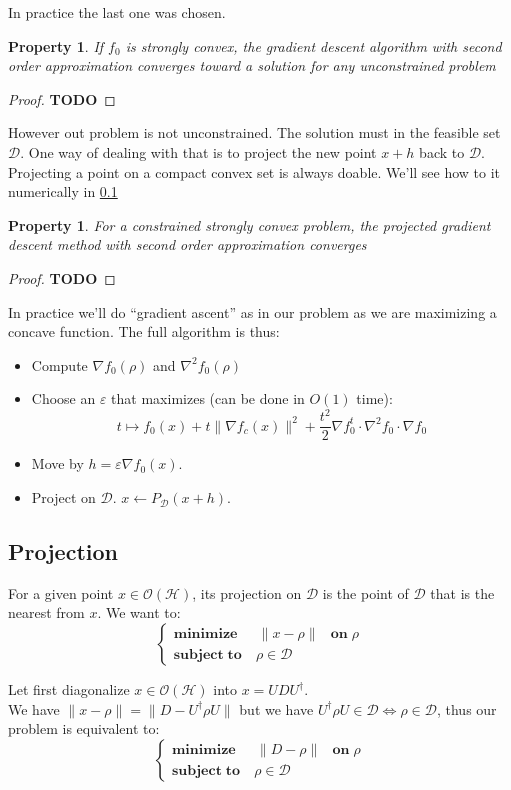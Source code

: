 \documentclass[10pt]{report}
\theoremstyle{plain}
\newtheorem{prop}[thm]{Property}
\theoremstyle{definition}
\theoremstyle{remark}
\newcommand{\TODO}{\textbf{TODO}}
\newcommand{\minim}[3]{\begin{cases}
    \mathbf{minimize}\;\,\quad #1& \mathbf{on}\; #2\\
    \mathbf{subject\;to}\quad #3
  \end{cases}}
\begin{document}
In practice the last one was chosen.
\begin{prop}
  If $f_0$ is strongly convex,
  the gradient descent algorithm with second order approximation converges
  toward a solution for any unconstrained problem
\end{prop}

\begin{proof}
  \TODO{}
\end{proof}

However out problem is not unconstrained. The solution must in the feasible set
$\mathcal{D}$. One way of dealing with that is to project the new point $x + h$
back to $\mathcal{D}$. Projecting a point on a compact convex set is always
doable. We'll see how to it numerically in \cref{ssec:proj}

\begin{prop}
  For a constrained strongly convex problem, the projected gradient descent
  method with second order approximation converges
\end{prop}

\begin{proof}
  \TODO{}
\end{proof}

In practice we'll do ``gradient ascent'' as in our problem as we are maximizing a
concave function. The full algorithm is thus:

\begin{itemize}
\item Compute $\nabla f_0(\rho)$ and $\nabla^2 f_0(\rho)$
\item Choose an $\varepsilon$ that maximizes (can be done in $O(1)$ time):
  \[t \mapsto f_0(x) + t\|\nabla f_c(x)\|^2 + \frac {t^2} 2 \nabla f_0^t \cdot
  \nabla^2\!f_0 \cdot \nabla f_0\]
\item Move by $h = \varepsilon \nabla f_0(x)$.
\item Project on $\mathcal{D}$. $x \leftarrow P_\mathcal{D}(x+h)$.
\end{itemize}

\subsection{Projection}\label{ssec:proj}

For a given point $x \in \mathcal{O}(\mathcal{H})$, its projection on
$\mathcal{D}$ is the point of $\mathcal{D}$ that is the nearest from $x$. We
want to:
\[\minim{\|x - \rho\|}{\rho}{\rho \in \mathcal{D}}\]

Let first diagonalize $x \in \mathcal{O}(\mathcal{H})$ into $x = UDU^\dagger$.\\
We have $\|x - \rho\| = \|D - U^\dagger \rho U\|$ but we have
$U^\dagger \rho U \in \mathcal{D}\iff
\rho \in \mathcal{D}$, thus our problem is equivalent to:
\[\minim{\|D - \rho\|}{\rho}{\rho \in \mathcal{D}}\]
\end{document}
